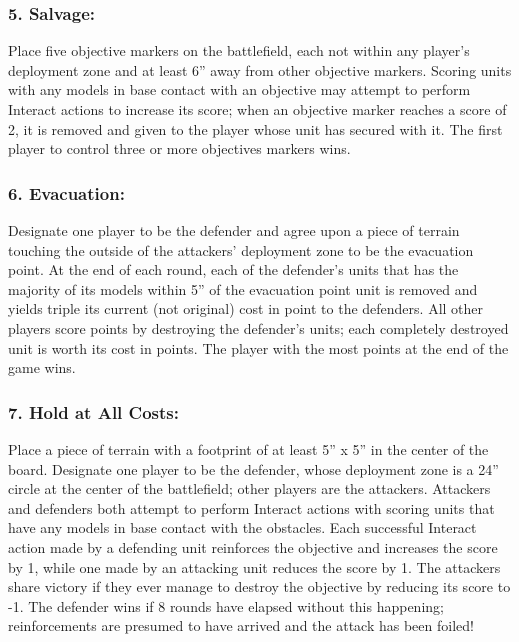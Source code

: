 \begin{multicols}{2}
\subsubsection*{5. Salvage:} Place five objective markers on the battlefield, each not within any player's deployment zone and at least 6'' away from other objective markers. Scoring units with any models in base contact with an objective may attempt to perform Interact actions to increase its score; when an objective marker reaches a score of 2, it is removed and given to the player whose unit has secured with it. The first player to control three or more objectives markers wins.

\subsubsection*{6. Evacuation:} Designate one player to be the defender and agree upon a piece of terrain touching the outside of the attackers' deployment zone to be the evacuation point. At the end of each round, each of the defender's units that has the majority of its models within 5'' of the evacuation point unit is removed and yields triple its current (not original) cost in point to the defenders. All other players score points by destroying the defender's units; each completely destroyed unit is worth its cost in points. The player with the most points at the end of the game wins.

\subsubsection*{7. Hold at All Costs:} Place a piece of terrain with a footprint of at least 5'' x 5'' in the center of the board. Designate one player to be the defender, whose deployment zone is a 24'' circle at the center of the battlefield; other players are the attackers. Attackers and defenders both attempt to perform Interact actions with scoring units that have any models in base contact with the obstacles. Each successful Interact action made by a defending unit reinforces the objective and increases the score by 1, while one made by an attacking unit reduces the score by 1. The attackers share victory if they ever manage to destroy the objective by reducing its score to -1. The defender wins if 8 rounds have elapsed without this happening; reinforcements are presumed to have arrived and the attack has been foiled!


\end{multicols}
